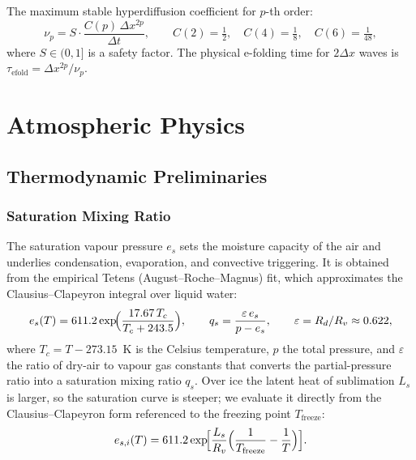 \documentclass[11pt,twoside]{report}
\newcommand{\Rd}{R_d}
\newcommand{\Ls}{L_s}
\newcommand{\Rv}{R_v}
\begin{document}
The maximum stable hyperdiffusion coefficient for $p$-th order:
\begin{equation}
  \nu_p = S\cdot\frac{C(p)\,\Delta x^{2p}}{\Delta t},
  \qquad
  C(2)=\tfrac{1}{2},\quad C(4)=\tfrac{1}{8},\quad C(6)=\tfrac{1}{48},
\end{equation}
where $S\in(0,1]$ is a safety factor.  The physical e-folding time for
$2\Delta x$ waves is $\tau_{\mathrm{efold}} = \Delta x^{2p}/\nu_p$.


\chapter{Atmospheric Physics}
\label{ch:physics}

\section{Thermodynamic Preliminaries}
\label{sec:thermo}

\subsection{Saturation Mixing Ratio}

The saturation vapour pressure $e_s$ sets the moisture capacity of the air
and underlies condensation, evaporation, and convective triggering. It is
obtained from the empirical Tetens (August--Roche--Magnus) fit, which
approximates the Clausius--Clapeyron integral over liquid water:
\begin{equation}
  e_s(T) = 611.2\exp\!\Bigl(\frac{17.67\,T_c}{T_c+243.5}\Bigr),
  \qquad q_s = \frac{\varepsilon\,e_s}{p-e_s},
  \qquad \varepsilon=\Rd/\Rv\approx 0.622,
\end{equation}
where $T_c = T - 273.15$~K is the Celsius temperature, $p$ the total
pressure, and $\varepsilon$ the ratio of dry-air to vapour gas constants
that converts the partial-pressure ratio into a saturation mixing ratio
$q_s$.  Over ice the latent heat of sublimation $\Ls$ is larger, so the
saturation curve is steeper; we evaluate it directly from the
Clausius--Clapeyron form referenced to the freezing point
$T_{\mathrm{freeze}}$:
\begin{equation}
  e_{s,i}(T) = 611.2\exp\!\Bigl[\frac{\Ls}{\Rv}
  \Bigl(\frac{1}{T_{\mathrm{freeze}}}-\frac{1}{T}\Bigr)\Bigr].
\end{equation}
\end{document}

